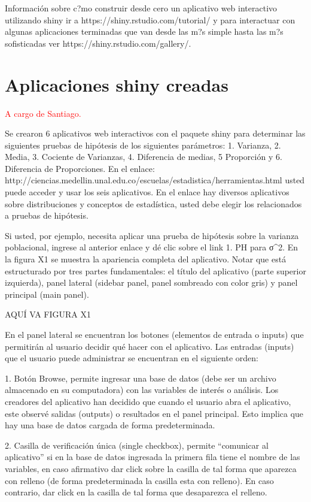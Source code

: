 \documentclass[]{comunicaciones}
\newcommand{\pkg}[1]{{\normalfont\fontseries{b}\selectfont #1}}
\begin{document}
Información sobre c?mo construir desde cero un aplicativo web interactivo utilizando shiny ir a https://shiny.rstudio.com/tutorial/ y para interactuar con algunas aplicaciones terminadas que van desde las m?s simple hasta las m?s sofisticadas ver https://shiny.rstudio.com/gallery/.

\section{Aplicaciones \pkg{shiny} creadas}
\textcolor{red}{A cargo de Santiago.}

Se crearon 6 aplicativos web interactivos con el paquete shiny para determinar las siguientes pruebas de hipótesis de los siguientes parámetros: 1. Varianza, 2. Media, 3. Cociente de Varianzas, 4. Diferencia de medias, 5 Proporción y 6. Diferencia de Proporciones. En el enlace: http://ciencias.medellin.unal.edu.co/escuelas/estadistica/herramientas.html usted puede acceder y usar los seis aplicativos. En el enlace hay diversos aplicativos sobre distribuciones y conceptos de estadística, usted debe elegir los relacionados a pruebas de hipótesis.

Si usted, por ejemplo,  necesita aplicar una prueba de hipótesis sobre la varianza poblacional, ingrese al anterior enlace y dé clic sobre el link 1. PH para σ^2. En la figura X1 se muestra la apariencia completa del aplicativo. Notar que está estructurado por tres partes fundamentales: el título del aplicativo (parte superior izquierda), panel lateral (sidebar panel, panel sombreado con color gris) y panel principal (main panel).

AQUÍ VA FIGURA X1

En el panel lateral se encuentran los botones (elementos de entrada o inputs) que permitirán al usuario decidir qué hacer con el aplicativo. Las entradas (inputs) que el usuario puede administrar se encuentran en el siguiente orden:

1.	Botón Browse, permite ingresar una base de datos (debe ser un archivo almacenado en su computadora) con las variables de interés o análisis. Los creadores del aplicativo han decidido que cuando el usuario abra el aplicativo, este observé salidas (outputs) o resultados en el panel principal. Esto implica que hay una base de datos cargada de forma predeterminada.

2.	Casilla de verificación única (single checkbox), permite “comunicar al aplicativo” si en la base de datos ingresada la primera fila tiene el nombre de las variables, en caso afirmativo dar click sobre la casilla de tal forma que aparezca con relleno (de forma predeterminada la casilla esta con relleno). En caso contrario, dar click en la casilla de tal forma que desaparezca el relleno.
\end{document}
